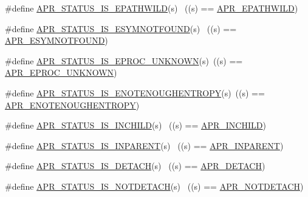 \begin{DoxyCompactItemize}
\item 
\#define \hyperlink{group___a_p_r___s_t_a_t_u_s___i_s_ga0c03d168c48e10d037339f5073ee2c03}{A\+P\+R\+\_\+\+S\+T\+A\+T\+U\+S\+\_\+\+I\+S\+\_\+\+E\+P\+A\+T\+H\+W\+I\+LD}(s)        ~((s) == \hyperlink{group___a_p_r___error_ga01d0fb965051103b5c8f15a43ad2c767}{A\+P\+R\+\_\+\+E\+P\+A\+T\+H\+W\+I\+LD})
\item 
\#define \hyperlink{group___a_p_r___s_t_a_t_u_s___i_s_gac8b05afdaacdfaa84454ace43464ed84}{A\+P\+R\+\_\+\+S\+T\+A\+T\+U\+S\+\_\+\+I\+S\+\_\+\+E\+S\+Y\+M\+N\+O\+T\+F\+O\+U\+ND}(s)  ~((s) == \hyperlink{group___a_p_r___error_ga8d96410fc32408160e1e85e2e96402fa}{A\+P\+R\+\_\+\+E\+S\+Y\+M\+N\+O\+T\+F\+O\+U\+ND})
\item 
\#define \hyperlink{group___a_p_r___s_t_a_t_u_s___i_s_gab1267636d1f3fe0dcb79a22b735a5010}{A\+P\+R\+\_\+\+S\+T\+A\+T\+U\+S\+\_\+\+I\+S\+\_\+\+E\+P\+R\+O\+C\+\_\+\+U\+N\+K\+N\+O\+WN}(s)~((s) == \hyperlink{group___a_p_r___error_ga01b21dc62b410707f44641d3cea3e6ed}{A\+P\+R\+\_\+\+E\+P\+R\+O\+C\+\_\+\+U\+N\+K\+N\+O\+WN})
\item 
\#define \hyperlink{group___a_p_r___s_t_a_t_u_s___i_s_gab8b0af2df80bfb9edfc8dbcbb6bdf925}{A\+P\+R\+\_\+\+S\+T\+A\+T\+U\+S\+\_\+\+I\+S\+\_\+\+E\+N\+O\+T\+E\+N\+O\+U\+G\+H\+E\+N\+T\+R\+O\+PY}(s)~((s) == \hyperlink{group___a_p_r___error_gaaee9e4e763844197e3750bb66ff75cd0}{A\+P\+R\+\_\+\+E\+N\+O\+T\+E\+N\+O\+U\+G\+H\+E\+N\+T\+R\+O\+PY})
\item 
\#define \hyperlink{group___a_p_r___s_t_a_t_u_s___i_s_gaf156073c5a8edd2db167258f299a75cd}{A\+P\+R\+\_\+\+S\+T\+A\+T\+U\+S\+\_\+\+I\+S\+\_\+\+I\+N\+C\+H\+I\+LD}(s)            ~((s) == \hyperlink{group___a_p_r___error_ga5a2bb63099778699feeae9627474c179}{A\+P\+R\+\_\+\+I\+N\+C\+H\+I\+LD})
\item 
\#define \hyperlink{group___a_p_r___s_t_a_t_u_s___i_s_ga6a8b21a7726a7907e7271525d4deabd9}{A\+P\+R\+\_\+\+S\+T\+A\+T\+U\+S\+\_\+\+I\+S\+\_\+\+I\+N\+P\+A\+R\+E\+NT}(s)          ~((s) == \hyperlink{group___a_p_r___error_ga79abc0fb43e51e0db87f90fa49745d89}{A\+P\+R\+\_\+\+I\+N\+P\+A\+R\+E\+NT})
\item 
\#define \hyperlink{group___a_p_r___s_t_a_t_u_s___i_s_ga2b4142665f8b935db158ec2edc3a9be0}{A\+P\+R\+\_\+\+S\+T\+A\+T\+U\+S\+\_\+\+I\+S\+\_\+\+D\+E\+T\+A\+CH}(s)              ~((s) == \hyperlink{group___a_p_r___error_gab3f8849983a52f6558016303fb4f5cff}{A\+P\+R\+\_\+\+D\+E\+T\+A\+CH})
\item 
\#define \hyperlink{group___a_p_r___s_t_a_t_u_s___i_s_gaa1700876a02293e3ed905fa03f360bbf}{A\+P\+R\+\_\+\+S\+T\+A\+T\+U\+S\+\_\+\+I\+S\+\_\+\+N\+O\+T\+D\+E\+T\+A\+CH}(s)        ~((s) == \hyperlink{group___a_p_r___error_ga83b8407fb5de5840f51dfd2c1439987b}{A\+P\+R\+\_\+\+N\+O\+T\+D\+E\+T\+A\+CH})

\end{DoxyCompactItemize}
